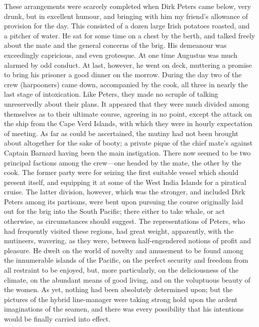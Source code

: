 These arrangements were scarcely completed when Dirk Peters came below, very
drunk, but in excellent humour, and bringing with him my friend's allowance of
provision for the day. This consisted of a dozen large Irish potatoes roasted,
and a pitcher of water. He sat for some time on a chest by the berth, and talked
freely about the mate and the general concerns of the brig. His demeanour was
exceedingly capricious, and even grotesque. At one time Augustus was much
alarmed by odd conduct. At last, however, he went on deck, muttering a promise
to bring his prisoner a good dinner on the morrow. During the day two of the
crew (harpooners) came down, accompanied by the cook, all three in nearly the
last stage of intoxication. Like Peters, they made no scruple of talking
unreservedly about their plans. It appeared that they were much divided among
themselves as to their ultimate course, agreeing in no point, except the attack
on the ship from the Cape Verd Islands, with which they were in hourly
expectation of meeting. As far as could be ascertained, the mutiny had not been
brought about altogether for the sake of booty; a private pique of the chief
mate's against Captain Barnard having been the main instigation. There now
seemed to be two principal factions among the crew---one headed by the mate, the
other by the cook. The former party were for seizing the first suitable vessel
which should present itself, and equipping it at some of the West India Islands
for a piratical cruise. The latter division, however, which was the stronger,
and included Dirk Peters among its partisans, were bent upon pursuing the course
originally laid out for the brig into the South Pacific; there either to take
whale, or act otherwise, as circumstances should suggest. The representations of
Peters, who had frequently visited these regions, had great weight, apparently,
with the mutineers, wavering, as they were, between half-engendered notions of
profit and pleasure. He dwelt on the world of novelty and amusement to be found
among the innumerable islands of the Pacific, on the perfect security and
freedom from all restraint to be enjoyed, but, more particularly, on the
deliciousness of the climate, on the abundant means of good living, and on the
voluptuous beauty of the women. As yet, nothing had been absolutely determined
upon; but the pictures of the hybrid line-manager were taking strong hold upon
the ardent imaginations of the seamen, and there was every possibility that his
intentions would be finally carried into effect. 

